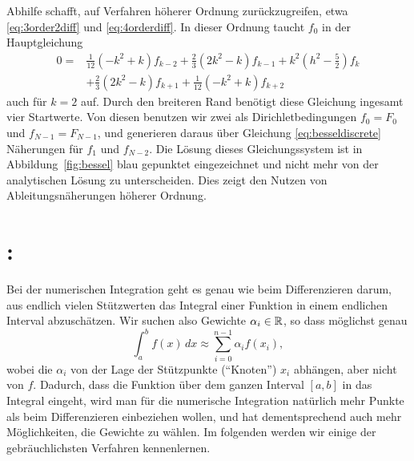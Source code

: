 Abhilfe schafft, auf Verfahren höherer Ordnung zurückzugreifen, etwa
\eqref{eq:3order2diff} und \eqref{eq:4orderdiff}. In dieser Ordnung
taucht $f_0$ in der Hauptgleichung
\begin{align}
  0 = &\frac{1}{12}(-k^2 + k)f_{k-2}
  + \frac{2}{3}(2k^2 - k)f_{k-1}
  + k^2\left(h^2 - \frac{5}{2}\right)f_k\nonumber\\
  &+ \frac{2}{3}(2k^2 - k)f_{k+1}
  + \frac{1}{12}(-k^2 + k)f_{k+2}
\end{align}
auch für $k=2$ auf. Durch den breiteren Rand benötigt diese Gleichung
ingesamt vier Startwerte. Von diesen benutzen wir zwei als
Dirichletbedingungen $f_0 = F_0$ und $f_{N-1} = F_{N-1}$, und
generieren daraus über Gleichung \eqref{eq:besseldiscrete} Näherungen
für $f_1$ und $f_{N-2}$. Die Lösung dieses Gleichungssystem ist in
Abbildung~\ref{fig:bessel} blau gepunktet eingezeichnet und nicht mehr
von der analytischen Lösung zu unterscheiden. Dies zeigt den Nutzen
von Ableitungsnäherungen höherer Ordnung.

\section{: }

Bei der numerischen Integration geht es genau wie beim Differenzieren
darum, aus endlich vielen Stützwerten das Integral einer Funktion in
einem endlichen Interval abzuschätzen. Wir suchen also Gewichte
$\alpha_{i}\in\mathbb{R}$, so dass möglichst genau
\begin{equation}
  \int_a^b f(x)\, dx \approx \sum_{i=0}^{n-1} \alpha_if(x_i),
\end{equation}
wobei die $\alpha_i$ von der Lage der Stützpunkte ("`Knoten"') $x_i$
abhängen, aber nicht von $f$. Dadurch, dass die Funktion über dem
ganzen Interval $[a,b]$ in das Integral eingeht, wird man für die
numerische Integration natürlich mehr Punkte als beim Differenzieren
einbeziehen wollen, und hat dementsprechend auch mehr Möglichkeiten,
die Gewichte zu wählen. Im folgenden werden wir einige der
gebräuchlichsten Verfahren kennenlernen.

\subsection{}

